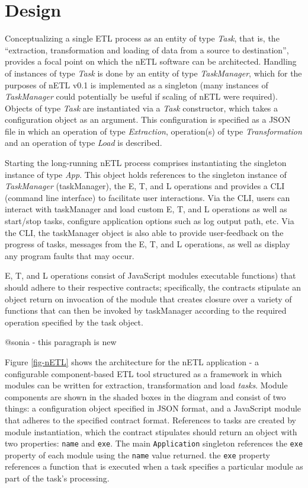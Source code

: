 \section{Design}
Conceptualizing a single ETL process as an entity of type \textit{Task}, that is, the ``extraction, transformation and loading of data from a source to destination'', provides a focal point on which the nETL software can be architected. Handling of instances of type \textit{Task} is done by an entity of type \textit{TaskManager}, which for the purposes of nETL v0.1 is implemented as a singleton (many instances of \textit{TaskManager} could potentially be useful if scaling of nETL were required). Objects of type \textit{Task} are instantiated via a \textit{Task} constructor, which takes a configuration object as an argument. This configuration is specified as a JSON file in which an operation of type \textit{Extraction}, operation(s) of type \textit{Transformation} and an operation of type \textit{Load} is described.

Starting the long-running nETL process comprises instantiating the singleton instance of type \textit{App}. This object holds references to the singleton instance of \textit{TaskManager} (taskManager), the E, T, and L operations and provides a CLI (command line interface) to facilitate user interactions. Via the CLI, users can interact with taskManager and load custom E, T, and L operations as well as start/stop tasks, configure application options such as log output path, etc. Via the CLI, the taskManager object is also able to provide user-feedback on the progress of tasks, messages from the E, T, and L operations, as well as display any program faults that may occur.

E, T, and L operations consist of JavaScript modules executable functions) that should adhere to their respective contracts; specifically, the contracts stipulate an object return on invocation of the module that creates closure over a variety of functions that can then be invoked by taskManager according to the required operation specified by the task object.



@sonia - this paragraph is new

Figure \ref{fig-nETL} shows the architecture for the nETL application - a configurable component-based ETL tool structured as a framework in which modules can be written for extraction, transformation and load \textit{tasks}. Module components are shown in the shaded boxes in the diagram and consist of two things: a configuration object specified in JSON format, and a JavaScript module that adheres to the specified contract format. References to tasks are created by module instantiation, which the contract stipulates should return an object with two properties: \texttt{name} and \texttt{exe}. The main \texttt{Application} singleton references the \texttt{exe} property of each module using the \texttt{name} value returned. the \texttt{exe} property references a function that is executed when a task specifies a particular module as part of the task's processing.

